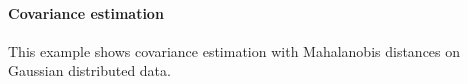 \documentclass[11pt]{article}
\begin{document}

\paragraph{Covariance estimation}

This example shows covariance estimation with Mahalanobis distances on Gaussian distributed data.




 
 

\end{document}
